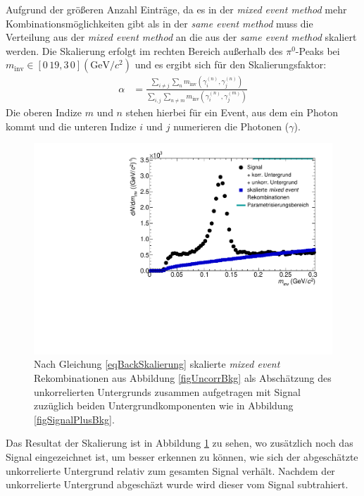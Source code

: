 Aufgrund der gr{\"o}{\ss}eren Anzahl Eintr{\"a}ge, da es in der \textit{mixed event method} mehr Kombinationsm\"oglichkeiten gibt als in der \textit{same event method} muss die Verteilung aus der \textit{mixed event method} an die aus der \textit{same event method} skaliert werden.
Die Skalierung erfolgt im rechten Bereich au{\ss}erhalb des $\pi^{0}$-Peaks bei $m_\text{inv} \in \left[0\,19,3\,0\right] (\text{GeV/}c^{2})$ und es ergibt sich f{\"u}r den Skalierungsfaktor:
\begin{align}
\label{eqBackSkalierung}
\alpha &= \frac{\sum_{i \neq j}\sum_{n}m_{\text{inv}}\left( \gamma^{(n)}_{i},\gamma^{(n)}_{j}\right) }{\sum_{i,j}\sum_{n \neq m}m_{\text{inv}}\left( \gamma^{(n)}_{i},\gamma^{(m)}_{j}\right) }
\end{align}
Die oberen Indize $m$ und $n$ stehen hierbei f{\"u}r ein Event, aus dem ein Photon kommt und die unteren Indize $i$ und $j$ numerieren die Photonen ($\gamma$).
\begin{figure}[tp]
\centering
\includegraphics[width=.75\linewidth]{hUncorrBkgNorm.pdf}
\caption{Nach Gleichung \ref{eqBackSkalierung} skalierte {\it mixed event} Rekombinationen aus Abbildung \ref{figUncorrBkg} als Absch{\"a}tzung des unkorrelierten Untergrunds zusammen aufgetragen mit Signal zuz{\"u}glich beiden Untergrundkomponenten wie in Abbildung \ref{figSignalPlusBkg}.}
\label{figUncorrBkgNorm}
\end{figure}
\newline
Das Resultat der Skalierung ist in Abbildung \ref{figUncorrBkgNorm} zu sehen, wo zus{\"a}tzlich noch das Signal eingezeichnet ist, um besser erkennen zu k{\"o}nnen, wie sich der abgesch{\"a}tzte unkorrelierte Untergrund relativ zum gesamten Signal verh{\"a}lt.
Nachdem der unkorrelierte Untergrund abgesch\"azt wurde wird dieser vom Signal subtrahiert.
